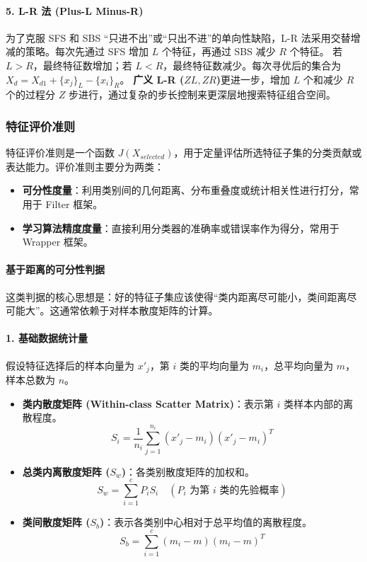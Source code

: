 \paragraph{5. L-R 法 (Plus-L Minus-R)}
为了克服 SFS 和 SBS “只进不出”或“只出不进”的单向性缺陷，L-R 法采用交替增减的策略。每次先通过 SFS 增加 $L$ 个特征，再通过 SBS 减少 $R$ 个特征。
若 $L > R$，最终特征数增加；若 $L < R$，最终特征数减少。每次寻优后的集合为 $X_d = X_{d1} + \{x_j\}_L - \{x_i\}_R$。
\textbf{广义 L-R ($ZL, ZR$)}更进一步，增加 $L$ 个和减少 $R$ 个的过程分 $Z$ 步进行，通过复杂的步长控制来更深层地搜索特征组合空间。

\subsubsection{特征评价准则}

\begin{definition}[特征评价准则]
    特征评价准则是一个函数 $J(X_{selected})$，用于定量评估所选特征子集的分类贡献或表达能力。评价准则主要分为两类：
    \begin{itemize}
        \item \textbf{可分性度量}：利用类别间的几何距离、分布重叠度或统计相关性进行打分，常用于 Filter 框架。
        \item \textbf{学习算法精度度量}：直接利用分类器的准确率或错误率作为得分，常用于 Wrapper 框架。
    \end{itemize}
\end{definition}

\paragraph{基于距离的可分性判据}
这类判据的核心思想是：好的特征子集应该使得“类内距离尽可能小，类间距离尽可能大”。这通常依赖于对样本散度矩阵的计算。

\paragraph{1. 基础数据统计量}
假设特征选择后的样本向量为 $x'_j$，第 $i$ 类的平均向量为 $m_i$，总平均向量为 $m$，样本总数为 $n$。
\begin{itemize}
    \item \textbf{类内散度矩阵 (Within-class Scatter Matrix)}：表示第 $i$ 类样本内部的离散程度。
    \[ S_i = \frac{1}{n_i} \sum_{j=1}^{n_i} (x'_j - m_i)(x'_j - m_i)^T \]
    \item \textbf{总类内离散度矩阵 ($S_w$)}：各类别散度矩阵的加权和。
    \[ S_w = \sum_{i=1}^c P_i S_i \quad (\text{$P_i$ 为第 $i$ 类的先验概率}) \]
    \item \textbf{类间散度矩阵 ($S_b$)}：表示各类别中心相对于总平均值的离散程度。
    \[ S_b = \sum_{i=1}^c (m_i - m)(m_i - m)^T \]
\end{itemize}

